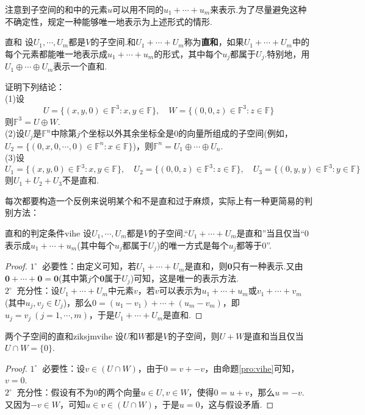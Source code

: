 \documentclass[lang=cn, zihao=5]{elegantbook}
\newcommand{\F}{\mathbb{F}}
\newcommand{\buzhou}[1]{$#1^{\circ} \ $}
\begin{document}
注意到子空间的和中的元素$u$可以用不同的$u_1+ \cdots + u_m$来表示.为了尽量避免这种不确定性，规定一种能够唯一地表示为上述形式的情形.

\begin{definition}{直和}
    设$U_1,\cdots ,U_m$都是$V$的子空间.和$U_1 + \cdots + U_m$称为\textbf{直和}，如果$U_1+ \cdots +U_m$中的每个元素都能唯一地表示成$u_1+ \cdots + u_m$的形式，其中每个$u_j$都属于$U_j$.特别地，用$U_1 \oplus \cdots \oplus U_m$表示一个直和.
\end{definition}

\begin{example}
    证明下列结论： \\
    (1)设$$U = \{ (x,y,0) \in \F ^{3} : x,y \in \F \}, \quad W = \{ (0,0,z) \in \F ^{3} : z \in \F \}$$
    则$\F ^{3} = U \oplus W$. \\
    (2)设$U_j$是$\F ^{n}$中除第$j$个坐标以外其余坐标全是$0$的向量所组成的子空间(例如，$U_2= \{ (0,x,0,\cdots ,0) \in \F ^{n} : x \in \F \}$)，则$\F ^{n} = U_1 \oplus \cdots \oplus U_n$. \\
    (3)设$$U_1 = \{ (x,y,0) \in \F ^{3} : x,y \in \F \}, \quad U_2 = \{ (0,0,z) \in \F ^{3} : z \in \F \}, \quad U_3 = \{ (0,y,y) \in \F ^{3} : y \in \F \}$$
    则$U_1+U_2+U_3$不是直和.
\end{example}

每次都要构造一个反例来说明某个和不是直和过于麻烦，实际上有一种更简易的判别方法：

\begin{proposition}{直和的判定条件}{vihe}
    设$U_1,\cdots ,U_m$都是$V$的子空间.“$U_1 + \cdots + U_m$是直和”当且仅当“$0$表示成$u_1+\cdots +u_m$(其中每个$u_j$都属于$U_j$)的唯一方式是每个$u_j$都等于$0$”.
\end{proposition}
\begin{proof}
    \buzhou{1} 必要性：由定义可知，若$U_1 + \cdots + U_m$是直和，则$\boldsymbol{0}$只有一种表示.又由$\boldsymbol{0} + \cdots + \boldsymbol{0} = \boldsymbol{0}$(其中第$j$个$\boldsymbol{0}$属于$U_j$)可知，这是唯一的表示方法. \\
    \buzhou{2} 充分性：设$U_1 + \cdots + U_m$中元素$v$，若$v$可以表示为$u_1 + \cdots + u_m$或$v_1 + \cdots + v_m$(其中$u_j,v_j \in U_j$)，那么$0 = (u_1 - v_1) + \cdots + (u_m - v_m)$，即$u_j=v_j ~(j=1,\cdots ,m)$，于是$U_1 + \cdots + U_m$是直和.
\end{proof}

\begin{proposition}{两个子空间的直和}{ziksjmvihe}
    设$U$和$W$都是$V$的子空间，则$U+W$是直和当且仅当$U \cap W = \{ 0 \}$.
\end{proposition}
\begin{proof}
    \buzhou{1} 必要性：设$v \in (U \cap W)$，由于$0 = v + -v$，由命题\ref{pro:vihe}可知，$v = 0$. \\
    \buzhou{2} 充分性：假设有不为$0$的两个向量$u \in U,v \in W$，使得$0 = u + v$，那么$u = -v$.又因为$-v \in W$，可知$u \in v \in (U \cap W)$，于是$u=0$，这与假设矛盾.
\end{proof}
\end{document}
